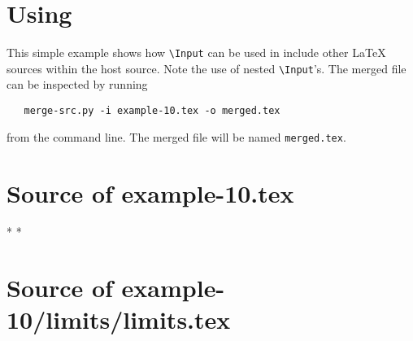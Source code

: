 \documentclass[12pt]{pylatex}
\begin{document}
\section*{Using {\copy\SlashInput}}


This simple example shows how {\tt\small\verb|\Input|} can be used in include other LaTeX sources within
the host source. Note the use of nested {\tt\small\verb|\Input|}'s. The merged file can be inspected by running

\begin{lstlisting}
   merge-src.py -i example-10.tex -o merged.tex
\end{lstlisting}

from the command line. The merged file will be named {\tt\small merged.tex}.



\vspace{-5pt}

\section*{Source of example-10.tex}

\bgroup
{}
\latexstyle
\begin{latex}
*   
*   
\end{latex}
\egroup

\vspace{10pt}

\section*{Source of example-10/limits/limits.tex}
\end{document}
